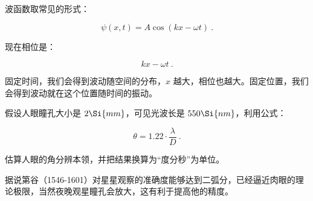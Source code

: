 波函数取常见的形式：

\begin{equation}
\psi (x,t )= A \cos \left( k x - \omega t \right)~.
\end{equation}

现在相位是：

\begin{equation}
k x - \omega t~.
\end{equation}

固定时间，我们会得到波动随空间的分布，$x$ 越大，相位也越大。固定位置，我们会得到波动就在这个位置随时间的振动。

\begin{exercise}{}
假设人眼瞳孔大小是 $2\Si{mm}$，可见光波长是 $550\Si{nm}$，利用公式：

\begin{equation}
\theta = 1.22 \cdot \frac{\lambda}{D}~.
\end{equation}

估算人眼的角分辨本领，并把结果换算为“度分秒”为单位。

据说第谷（1546-1601）对星星观察的准确度能够达到二弧分，已经逼近肉眼的理论极限，当然夜晚观星瞳孔会放大，这有利于提高他的精度。
\end{exercise}

